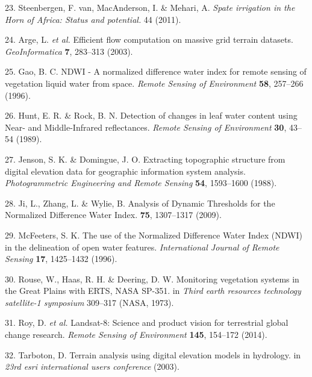 \documentclass[12pt,oneside]{article}
\begin{document}
\leavevmode\hypertarget{ref-VanSteenbergen_et_al_2011}{}%
23. Steenbergen, F. van, MacAnderson, I. \& Mehari, A. \emph{Spate irrigation in the Horn of Africa: Status and potential.} 44 (2011).

\leavevmode\hypertarget{ref-Arge_et_al_2003}{}%
24. Arge, L. \emph{et al.} Efficient flow computation on massive grid terrain datasets. \emph{GeoInformatica} \textbf{7}, 283--313 (2003).

\leavevmode\hypertarget{ref-Gao_1996}{}%
25. Gao, B. C. NDWI - A normalized difference water index for remote sensing of vegetation liquid water from space. \emph{Remote Sensing of Environment} \textbf{58}, 257--266 (1996).

\leavevmode\hypertarget{ref-Hunt_and_Rock_1989}{}%
26. Hunt, E. R. \& Rock, B. N. Detection of changes in leaf water content using Near- and Middle-Infrared reflectances. \emph{Remote Sensing of Environment} \textbf{30}, 43--54 (1989).

\leavevmode\hypertarget{ref-Jenson_and_Domingue_1988}{}%
27. Jenson, S. K. \& Domingue, J. O. Extracting topographic structure from digital elevation data for geographic information system analysis. \emph{Photogrammetric Engineering and Remote Sensing} \textbf{54}, 1593--1600 (1988).

\leavevmode\hypertarget{ref-Ji_et_al_2009}{}%
28. Ji, L., Zhang, L. \& Wylie, B. Analysis of Dynamic Thresholds for the Normalized Difference Water Index. \textbf{75}, 1307--1317 (2009).

\leavevmode\hypertarget{ref-McFeeters_1996}{}%
29. McFeeters, S. K. The use of the Normalized Difference Water Index (NDWI) in the delineation of open water features. \emph{International Journal of Remote Sensing} \textbf{17}, 1425--1432 (1996).

\leavevmode\hypertarget{ref-Rouse_et_al_1973}{}%
30. Rouse, W., Haas, R. H. \& Deering, D. W. Monitoring vegetation systems in the Great Plains with ERTS, NASA SP-351. in \emph{Third earth resources technology satellite-1 symposium} 309--317 (NASA, 1973).

\leavevmode\hypertarget{ref-Roy_et_al_2014}{}%
31. Roy, D. \emph{et al.} Landsat-8: Science and product vision for terrestrial global change research. \emph{Remote Sensing of Environment} \textbf{145}, 154--172 (2014).

\leavevmode\hypertarget{ref-Tarboton_2003}{}%
32. Tarboton, D. Terrain analysis using digital elevation models in hydrology. in \emph{23rd esri international users conference} (2003).
\end{document}
